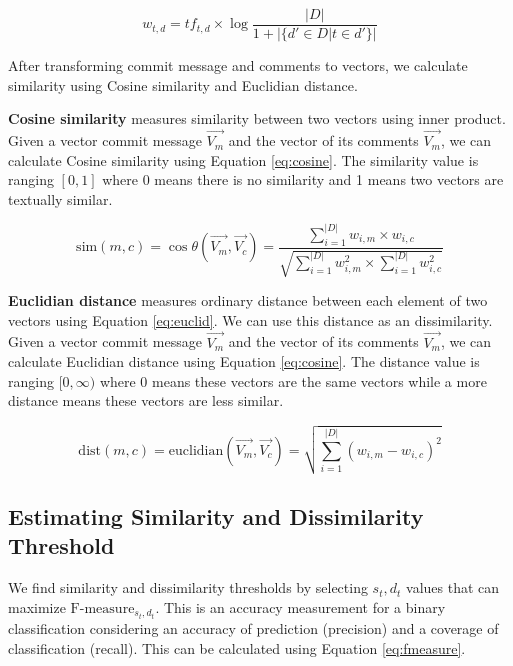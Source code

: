 \documentclass[conference]{IEEEtran}
\begin{document}
\begin{equation}
w_{t,d} = tf_{t,d} \times \log\frac{|D|}{1+|\{d' \in D | t \in d'\}|}
\label{eq:tf-idf}
\end{equation}

After transforming commit message and comments to vectors, we calculate similarity using Cosine similarity and Euclidian distance. 


\noindent\textbf{Cosine similarity} measures similarity between two vectors using inner product. Given a vector commit message $\overrightarrow{V_m}$ and the vector of its comments $\overrightarrow{V_m}$, we can calculate Cosine similarity using Equation \ref{eq:cosine}. The similarity value is ranging $[0,1]$ where 0 means there is no similarity and 1 means two vectors are textually similar.  

\begin{equation}
\mathrm{sim}(m,c) = \cos\theta(\overrightarrow{V_m},\overrightarrow{V_c}) = \frac{\sum_{i=1}^{|D|} w_{i,m} \times w_{i,c}}{\sqrt{\sum_{i=1}^{|D|} w^2_{i,m} \times \sum_{i=1}^{|D|} w^2_{i,c}}}
\label{eq:cosine}
\end{equation}

\noindent\textbf{Euclidian distance} measures ordinary distance between each element of two vectors using Equation \ref{eq:euclid}. We can use this distance as an dissimilarity. Given a vector commit message $\overrightarrow{V_m}$ and the vector of its comments $\overrightarrow{V_m}$, we can calculate Euclidian distance using Equation \ref{eq:cosine}. The distance value is ranging $[0,\infty)$ where 0 means these vectors are the same vectors while a more distance means these vectors are less similar.

\begin{equation}
\mathrm{dist}(m,c) = \mathrm{euclidian}(\overrightarrow{V_m},\overrightarrow{V_c}) = \sqrt{\sum_{i=1}^{|D|}(w_{i,m} - w_{i,c})^2}
\label{eq:euclid}
\end{equation}

\subsection{Estimating Similarity and Dissimilarity Threshold}
We find similarity and dissimilarity thresholds by selecting $s_t,d_t$ values that can maximize $\mathrm{F\text{-}measure}_{s_t,d_t}$. This is an accuracy measurement for a binary classification considering an accuracy of prediction (precision) and  a coverage of classification (recall). This can be calculated using Equation \ref{eq:fmeasure}.
\end{document}
